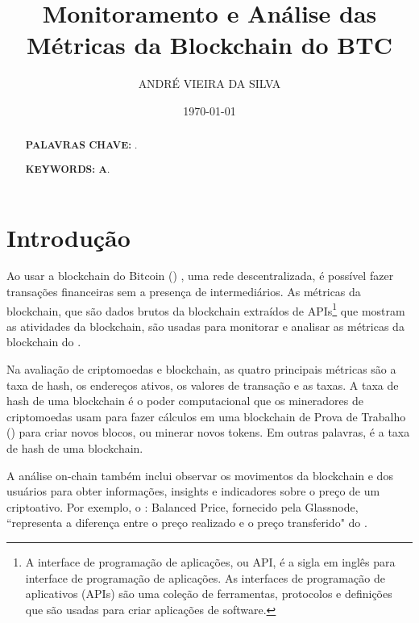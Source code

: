 \documentclass[a4paper,12pt]{article}
\title{ \textbf{\large Monitoramento e Análise das Métricas da Blockchain do BTC}}
\author{ANDRÉ VIEIRA DA SILVA}
\date{\today}
\begin{document}
\maketitle


\begin{abstract}
\textbf{PALAVRAS CHAVE: }.
\end{abstract}

\begin{abstract}

\textbf{KEYWORDS: A}.
\end{abstract}


\newpage
\tableofcontents


\section{Introdução}
\hspace{0.5cm}Ao usar a blockchain do Bitcoin (\btc) \cite{nakamoto2008bitcoin}, uma rede descentralizada, 
é possível fazer transações financeiras sem a presença de intermediários. 
As métricas da blockchain, que são dados brutos da blockchain extraídos de 
APIs\footnote{A interface de programação de aplicações, ou API, é a sigla em inglês para interface 
de programação de aplicações. As interfaces de programação de aplicativos (APIs) são uma coleção de ferramentas, protocolos e definições que são usadas para criar aplicações de software.
} que mostram as atividades da blockchain, são usadas para monitorar e 
analisar as métricas da blockchain do \btc.

Na avaliação de criptomoedas e blockchain, as quatro principais métricas são 
a taxa de hash, os endereços ativos, os valores de transação e as taxas.
A taxa de hash de uma blockchain é o poder computacional que os mineradores 
de criptomoedas usam para fazer cálculos em uma blockchain de Prova de Trabalho (\pow)
para criar novos blocos, ou minerar novos tokens. Em outras palavras, é a taxa 
de hash de uma blockchain.

A análise on-chain também inclui observar os movimentos da blockchain e dos usuários 
para obter informações, insights e indicadores sobre o preço de um criptoativo. 
Por exemplo, o \btc: Balanced Price, fornecido pela Glassnode, ``representa a diferença 
entre o preço realizado e o preço transferido" do \btc. 
\end{document}
